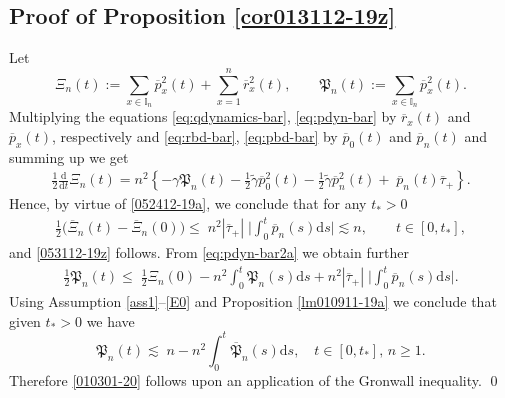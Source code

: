 \documentclass[EJP]{ejpecp} %
\newcommand\T{{\mathbb I}}
\renewcommand{\ge}{\geqslant}
\renewcommand{\le}{\leqslant}
\newcommand{\dd  }{\mathrm{d}}
\renewcommand{\tilde}{\widetilde}
\renewcommand{\bar}{\overline}
\numberwithin{equation}{section}
\begin{document}













\subsection{Proof of Proposition \ref{cor013112-19z}}

\label{sec6.1}




Let
 $$
 \Xi_n(t) :=\sum_{ x\in\T_n} \bar  p_{x}^2(t)+\sum_{ x=1}^{n}  \bar
 r_{x}^2(t),\qquad \mathfrak{P}_n(t):=\sum_{ x\in \T_n} \bar  p_{x}^2(t).
 $$
 Multiplying the  equations \eqref{eq:qdynamics-bar},
 \eqref{eq:pdyn-bar} by $\bar  r_x(t)$
 and $\bar p_x(t)$, respectively and
 \eqref{eq:rbd-bar}, \eqref{eq:pbd-bar} by $ \bar   p_0(t)   $ and
 $\bar    p_n(t)$ and summing up we get
\begin{align}
     \frac12\frac{\dd}{\dd t}  \Xi_n(t)
 =n^2\left\{-\gamma \mathfrak{P}_n(t)-\frac12\tilde \gamma
       \bar p_0^2(t) -\frac12 
      \tilde \gamma\bar p_n^2(t)+ \; \bar p_n(t)\bar\tau_+\right\}.
      \label{eq:pdyn-bar2a}
 \end{align}
Hence, by virtue of \eqref{052412-19a}, we conclude that for any $t_*>0$
\begin{align}
     \frac12\Big( \bar\Xi_n(t) -\bar\Xi_n(0)\Big) \le \;
  n^2|\bar\tau_+|\;\bigg|\int_0^t\bar p_n(s)\dd s\bigg|\lesssim n,\qquad t\in[0,t_*],
      \label{eq:pdyn-bar2aa}
 \end{align}
and \eqref{053112-19z} follows.
From \eqref{eq:pdyn-bar2a} we obtain further
\begin{align}
     \frac12  \mathfrak{P}_n(t) \le \; \frac12 \Xi_n(0)
  -n^2\int_0^t  \mathfrak{P}_n(s)\dd s+n^2|\bar\tau_+|\;\bigg|\int_0^t\bar
  p_n(s)\dd s \bigg|.
      \label{010301-20a}
 \end{align}
Using Assumption \ref{ass1}--\eqref{E0} and Proposition \ref{lm010911-19a} we conclude that given
$t_*>0$ we have
\begin{equation}
    \mathfrak{P}_n(t) \lesssim \;n
  -n^2\int_0^t \bar{\mathfrak{P}}_n(s)\dd s
      \label{010301-20c},\quad t\in[0,t_*],\,n\ge1.
 \end{equation}
Therefore
\eqref{010301-20} follows upon an application of the Gronwall inequality.
\qed
\end{document}
